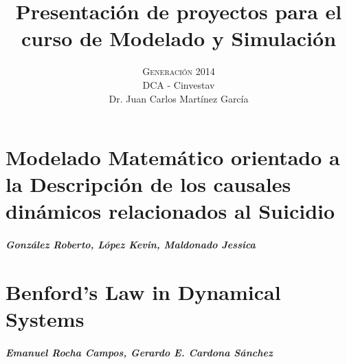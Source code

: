 



\title{\vspace{-15mm}\fontsize{24pt}{10pt}\selectfont\textbf{Presentación de proyectos para el curso de Modelado y Simulación}}

\author{
\large \textsc{Generación 2014}\\[2mm]
\normalsize DCA - Cinvestav \\
\normalsize Dr. Juan Carlos Martínez García
\vspace{-5mm}
}
\date{}




    \maketitle
    \thispagestyle{fancy}
    \tableofcontents


    \chapter{Modelado Matemático orientado a la Descripción de los causales dinámicos relacionados al Suicidio}
    \paragraph{González Roberto, López Kevin, Maldonado Jessica}
    

    \chapter{Benford's Law in Dynamical Systems}
    \paragraph{Emanuel Rocha Campos, Gerardo E. Cardona Sánchez}
    


